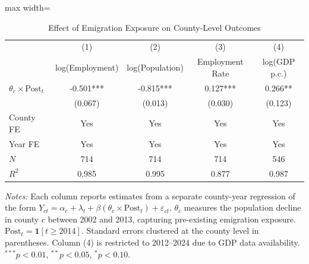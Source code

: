 \begin{table}[htbp]
\centering
\caption{Effect of Emigration Exposure on County-Level Outcomes}
\label{tab:main}
\begin{adjustbox}{max width=\textwidth}
\begin{tabular}{lcccc}
\toprule
 & (1) & (2) & (3) & (4) \\
 & log(Employment) & log(Population) & Employment Rate & log(GDP p.c.) \\
\midrule
$\theta_c \times \text{Post}_{t}$ & -0.501*** & -0.815*** & 0.127*** & 0.266** \\
 & (0.067) & (0.013) & (0.030) & (0.123) \\
\addlinespace
County FE & Yes & Yes & Yes & Yes \\
Year FE & Yes & Yes & Yes & Yes \\
$N$ & 714 & 714 & 714 & 546 \\
$R^2$ & 0.985 & 0.995 & 0.877 & 0.987 \\
\bottomrule
\end{tabular}
\end{adjustbox}
\begin{flushleft}\small
\textit{Notes:} Each column reports estimates from a separate county-year regression of the form $Y_{ct} = \alpha_c + \lambda_t + \beta(\theta_c \times \text{Post}_t) + \varepsilon_{ct}$. $\theta_c$ measures the population decline in county $c$ between 2002 and 2013, capturing pre-existing emigration exposure. $\text{Post}_t = \mathbf{1}[t \geq 2014]$. Standard errors clustered at the county level in parentheses. Column (4) is restricted to 2012--2024 due to GDP data availability. $^{***}p<0.01$, $^{**}p<0.05$, $^{*}p<0.10$.
\end{flushleft}
\end{table}

